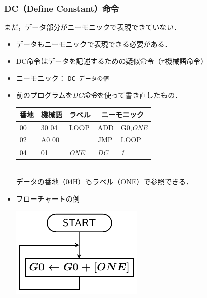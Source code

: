 \documentclass{beamer}                 %
\begin{document}
\begin{frame}
  \frametitle{DC（Define Constant）命令}
  まだ，データ部分がニーモニックで表現できていない．\\
  \vfill

  \begin{itemize}
  \item データもニーモニックで表現できる必要がある．
  \vfill
  
  \item DC命令はデータを記述するための疑似命令（≠機械語命令） \\
  \vfill

  \item ニーモニック： \texttt{DC データの値}
  \vfill

  \item 前のプログラムを\emph{DC命令}を使って書き直したもの．
    {\ttfamily\footnotesize\begin{center}
      \begin{tabular}{|l|l|l|l l|} \hline
        番地 & 機械語 & ラベル & \multicolumn{2}{|c|}{ニーモニック} \\
        \hline
        00 & 30 04 & LOOP        & ADD        & G0,\emph{ONE} \\
        02 & A0 00 &             & JMP        & LOOP          \\
        04 & 01    & \emph{ONE}  & \emph{DC}  & \emph{1}      \\
        \hline
      \end{tabular}\\
      データの番地（04H）もラベル（ONE）で参照できる．
    \end{center}}
    \vfill

  \item フローチャートの例\\
    \centerline{\includegraphics[scale=0.7]{../Tikz/flow0A.pdf}}
  \end{itemize}
  \vfill

 \end{frame}
\end{document}
